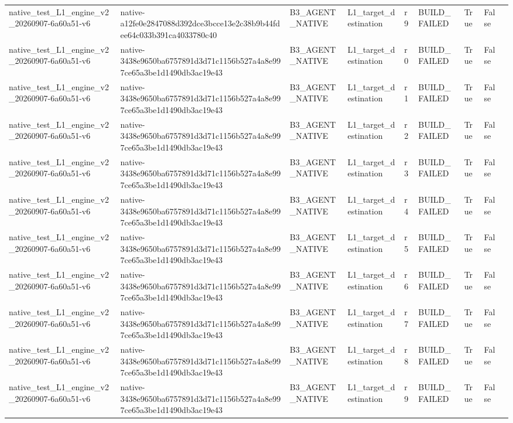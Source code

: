 \begin{tabular}{lllllllll}
native\_test\_L1\_engine\_v2\_20260907-6a60a51-v6 & native-a12fe0e2847088d392dce3bcce13e2c38b9b44fdee64c033b391ca4033780c40 & B3\_AGENT\_NATIVE & L1\_target\_destination & r9 & BUILD\_FAILED & True & False &  \\
native\_test\_L1\_engine\_v2\_20260907-6a60a51-v6 & native-3438e9650ba6757891d3d71c1156b527a4a8e997ce65a3be1d1490db3ac19e43 & B3\_AGENT\_NATIVE & L1\_target\_destination & r0 & BUILD\_FAILED & True & False &  \\
native\_test\_L1\_engine\_v2\_20260907-6a60a51-v6 & native-3438e9650ba6757891d3d71c1156b527a4a8e997ce65a3be1d1490db3ac19e43 & B3\_AGENT\_NATIVE & L1\_target\_destination & r1 & BUILD\_FAILED & True & False &  \\
native\_test\_L1\_engine\_v2\_20260907-6a60a51-v6 & native-3438e9650ba6757891d3d71c1156b527a4a8e997ce65a3be1d1490db3ac19e43 & B3\_AGENT\_NATIVE & L1\_target\_destination & r2 & BUILD\_FAILED & True & False &  \\
native\_test\_L1\_engine\_v2\_20260907-6a60a51-v6 & native-3438e9650ba6757891d3d71c1156b527a4a8e997ce65a3be1d1490db3ac19e43 & B3\_AGENT\_NATIVE & L1\_target\_destination & r3 & BUILD\_FAILED & True & False &  \\
native\_test\_L1\_engine\_v2\_20260907-6a60a51-v6 & native-3438e9650ba6757891d3d71c1156b527a4a8e997ce65a3be1d1490db3ac19e43 & B3\_AGENT\_NATIVE & L1\_target\_destination & r4 & BUILD\_FAILED & True & False &  \\
native\_test\_L1\_engine\_v2\_20260907-6a60a51-v6 & native-3438e9650ba6757891d3d71c1156b527a4a8e997ce65a3be1d1490db3ac19e43 & B3\_AGENT\_NATIVE & L1\_target\_destination & r5 & BUILD\_FAILED & True & False &  \\
native\_test\_L1\_engine\_v2\_20260907-6a60a51-v6 & native-3438e9650ba6757891d3d71c1156b527a4a8e997ce65a3be1d1490db3ac19e43 & B3\_AGENT\_NATIVE & L1\_target\_destination & r6 & BUILD\_FAILED & True & False &  \\
native\_test\_L1\_engine\_v2\_20260907-6a60a51-v6 & native-3438e9650ba6757891d3d71c1156b527a4a8e997ce65a3be1d1490db3ac19e43 & B3\_AGENT\_NATIVE & L1\_target\_destination & r7 & BUILD\_FAILED & True & False &  \\
native\_test\_L1\_engine\_v2\_20260907-6a60a51-v6 & native-3438e9650ba6757891d3d71c1156b527a4a8e997ce65a3be1d1490db3ac19e43 & B3\_AGENT\_NATIVE & L1\_target\_destination & r8 & BUILD\_FAILED & True & False &  \\
native\_test\_L1\_engine\_v2\_20260907-6a60a51-v6 & native-3438e9650ba6757891d3d71c1156b527a4a8e997ce65a3be1d1490db3ac19e43 & B3\_AGENT\_NATIVE & L1\_target\_destination & r9 & BUILD\_FAILED & True & False &  \\

\end{tabular}
